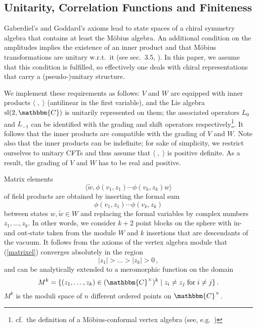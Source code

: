 \documentclass[a4paper,12pt,twoside]{article}
\renewcommand{\b}{\langle}
\renewcommand{\k}{\rangle}
\newcommand{\bC}{\mathbbm{C}}
\newcommand{\bCc}{\mathbbm{C}^{\times}}
\newcommand{\eq}[1]{(\ref{#1})}
\newcommand{\wt}{\tilde{w}}
\begin{document}
\subsection{Unitarity, Correlation Functions and Finiteness}
\label{Unitarity,_Correlation_Functions_and_Finiteness}
Gaberdiel's and Goddard's axioms lead to
state spaces of a chiral symmetry algebra
that contains at least the M\"{o}bius algebra.
An additional condition on the amplitudes implies the existence of
an inner product and that M\"{o}bius transformations are unitary w.r.t.\ it
(see sec.\ 3.5, \cite{Gaberdiel2}).
In this paper, we assume that this condition is fulfilled,
so effectively one deals with chiral
representations that carry a (pseudo-)unitary structure.

We implement these requirements as follows:
$V$ and $W$ are equipped with inner products $\b\;,\;\k$ (antilinear in the
first variable),
and the Lie algebra ${\rm sl}(2,\bC)$ is unitarily represented on them;
the associated operators $L_0$ and $L_{-1}$ can be identified with the grading
and shift operators respectively\footnote{cf.\ the definition of a
M\"{o}bius-conformal vertex algebra (see, e.g.\ \cite{Kac})}.
It follows that the inner products are compatible
with the grading of $V$ and $W$. Note also that
the inner products can be indefinite; for sake of simplicity, we restrict
ourselves to unitary CFTs and
thus assume that $\b\;,\;\k$ is positive definite.
As a result, the grading of $V$ and $W$ has to be real and positive.

Matrix elements
\begin{equation}
\label{matrixel}
\b\wt, \phi(v_1,z_1)\cdots\phi(v_k,z_k)w\k
\end{equation}
of field products are obtained by inserting
the formal sum
$$\phi(v_1,z_1)\cdots\phi(v_k,z_k)$$
between states $w, \wt\in W$
and replacing the formal variables by complex numbers $z_1,\ldots,z_k$.
In other words, we consider $k+2$ point blocks on the sphere with
in- and out-state taken from the module $W$ and $k$ insertions that are
descendants of the vacuum.
It follows from the axioms of the vertex algebra module
that \eq{matrixel}
converges absolutely in the region
$$|z_1|>\ldots>|z_k|> 0\,,$$
and can be analytically extended to a meromorphic function
on the domain
$$M^k = \{(z_1,\ldots,z_k)\in (\bCc)^k\;|\;z_i\ne
z_j\;\mbox{for}\;
i\ne
j\}\,.$$
$M^k$ is the moduli space of $n$ different ordered points
on $\bCc$.
\end{document}
